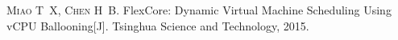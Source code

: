 
\begin{publications}{99}

    \item\textsc{Miao T~X, Chen H~B}. {FlexCore: Dynamic Virtual Machine Scheduling Using vCPU Ballooning}[J].
      Tsinghua Science and Technology, 2015.

    
\end{publications}
